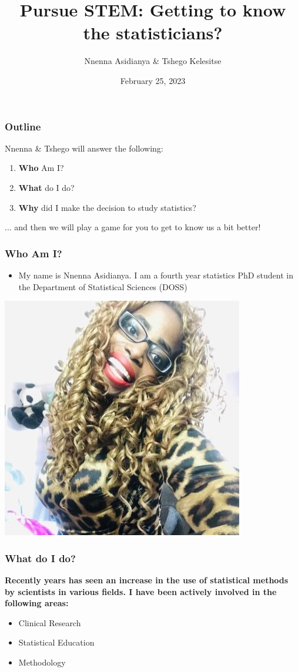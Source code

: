 \documentclass{beamer}
\title[Pursue STEM]{Pursue STEM: Getting to know the statisticians?} %
\author[Nnenna \& Tshego]{Nnenna Asidianya \& Tshego Kelesitse} %
\institute[U of T] %
{
University of Toronto \\ %
\medskip
\textit{nnenna.asidianya@mail.utoronto.ca \\ tshego.kelesitse@mail.utoronto.ca} %
}
\date{February 25, 2023} %
\begin{document}
\begin{frame}
\titlepage %
\end{frame}

\begin{frame}
\frametitle{Outline} %

Nnenna \& Tshego will answer the following:

\begin{enumerate}
	\item \textbf{Who} Am I?
	\item \textbf{What} do I do?
	\item \textbf{Why} did I make the decision to study statistics?
\end{enumerate}

... and then we will play a game for you to get to know us a bit better!
\end{frame}




\begin{frame}
\frametitle{\textbf{Who} Am I?}
\begin{itemize}
	\item My name is Nnenna Asidianya. I am a fourth year statistics PhD student in the Department of Statistical Sciences (DOSS)
\end{itemize}
	\begin{center}
	\includegraphics[width=0.4\linewidth]{me.jpg}
	\begin{figure}[H]
	\end{figure}
\end{center}


\end{frame}


\begin{frame}
\frametitle{ \textbf{What} do I do?}
\textbf{Recently years has seen an increase in the use of statistical methods by scientists in various fields. I have been actively involved in the following areas:}\\
\begin{itemize}
	\item Clinical Research 
	\item Statistical Education 
	\item Methodology 
\end{itemize}
\end{frame}
\end{document}

